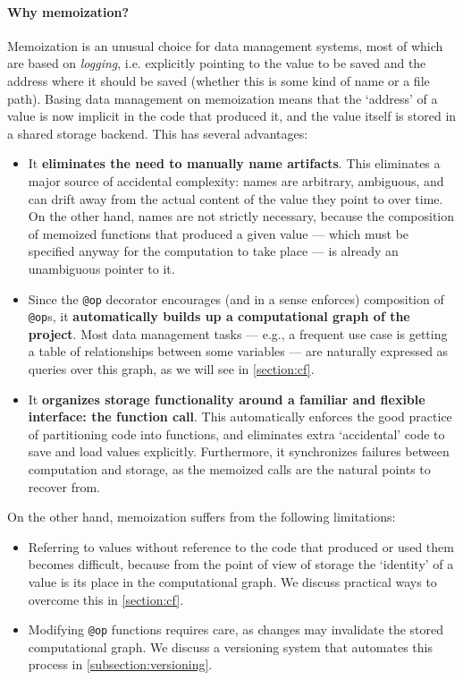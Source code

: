 \paragraph{Why memoization?} Memoization is an unusual choice for data
management systems, most of which are based on \emph{logging}, i.e. explicitly
pointing to the value to be saved and the address where it should be saved
(whether this is some kind of name or a file path). Basing data management on
memoization means that the `address' of a value is now implicit in the code that
produced it, and the value itself is stored in a shared storage backend. This has several advantages:
\begin{itemize}
\item It \textbf{eliminates the need to manually name artifacts}. This
eliminates a major source of accidental complexity: names are arbitrary,
ambiguous, and can drift away from the actual content of the value they point to
over time. On the other hand, names are not strictly necessary, because the
composition of memoized functions that produced a given value --- which must be
specified anyway for the computation to take place --- is already an unambiguous
pointer to it.
\item Since the \texttt{@op} decorator encourages (and in a sense enforces)
composition of \texttt{@op}s, it \textbf{automatically builds up a computational
graph of the project}. Most data management tasks --- e.g., a frequent use case
is getting a table of relationships between some variables --- are naturally
expressed as queries over this graph, as we will see in \autoref{section:cf}.
\item It \textbf{organizes storage functionality around a familiar and flexible
interface: the function call}. This automatically enforces the good practice
of partitioning code into functions, and eliminates extra `accidental' code to
save and load values explicitly. Furthermore, it synchronizes failures between
computation and storage, as the memoized calls are the natural points to
recover from.
\end{itemize}

On the other hand, memoization suffers from the following limitations:
\begin{itemize}
\item Referring to values without reference to the code that produced or used
them becomes difficult, because from the point of view of storage the `identity'
of a value is its place in the computational graph. We discuss practical ways to
overcome this in \autoref{section:cf}.
\item Modifying \texttt{@op} functions requires care, as changes may invalidate
the stored computational graph. We discuss a versioning system that automates this process in \autoref{subsection:versioning}.
\end{itemize}

